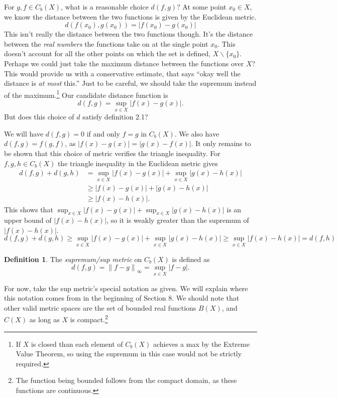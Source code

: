 \documentclass{article}
\newcommand{\norm}[1]{\left\lVert#1\right\rVert}
\theoremstyle{definition}
\newtheorem{definition}{Definition}[section]
\begin{document}
	For $ g,f\in C_b(X) $, what is a reasonable choice $ d(f,g) $? At some point $ x_0\in X $, we know the distance between the two functions is given by the Euclidean metric. $$d(f(x_0),g(x_0))=|f(x_0)-g(x_0)| $$ This isn't really the distance between the two functions though. It's the distance between the \textit{real numbers} the functions take on at the single point $ x_0 $. This doesn't account for all the other points on which the set is defined, $ X\backslash\{x_0\} $. Perhaps we could just take the maximum distance between the functions over $ X $? This would provide us with a conservative estimate, that says ``okay well the distance is \textit{at most} this.'' Just to be careful, we should take the supremum instead of the maximum.\footnote{If $ X $ is closed than each element of $ C_b(X) $ achieves a max by the Extreme Value Theorem, so using the supremum in this case would not be strictly required.} Our candidate distance function is $$d(f,g)=\sup_{x\in X}|f(x)-g(x)| .$$
	But does this choice of $ d $ satisfy definition 2.1?
	
	We will have $ d(f,g)=0 $ if and only $ f=g $ in $ C_b(X) $. We also have $ d(f,g)=f(g,f) $, as $ |f(x)-g(x)|=|g(x)-f(x)|  $. It only remains to be shown that this choice of metric verifies the triangle inequality. For $ f,g,h\in C_b(X) $ the triangle inequality in the Euclidean metric gives  
	\begin{align*}
		d(f,g)+d(g,h)&=\sup_{x\in X}|f(x)-g(x)|+\sup_{x\in X}|g(x)-h(x)|\\
		&\ge |f(x)-g(x)|+|g(x)-h(x)|\\
		&\ge |f(x)-h(x)|.
	\end{align*}
	This shows that $ \sup_{x\in X}|f(x)-g(x)|+\sup_{x\in X}|g(x)-h(x)| $ is an upper bound of $ |f(x)-h(x)| $, so it is weakly greater than the supremum of $ |f(x)-h(x)| $.
	$$	d(f,g)+d(g,h)\ge \sup_{x\in X}|f(x)-g(x)|+\sup_{x\in X}|g(x)-h(x)|\ge \sup_{x\in X} |f(x)-h(x)|=d(f,h) $$
	\begin{definition}\label{def7.4}
		The \textit{\color{red}supremum/sup metric} on $ C_b(X) $ is defined as $$d(f,g)=\norm{f-g}_\infty=\sup_{x\in X}|f-g|. $$
	\end{definition}
	For now, take the sup metric's special notation as given. We will explain where this notation comes from in the beginning of Section 8. We should note that other valid metric spaces are the set of bounded real functions $ B(X) $, and $ C(X) $ as long as $ X $ is compact.\footnote{The function being bounded follows from the compact domain, as these functions are continuous. }
	
\end{document}
